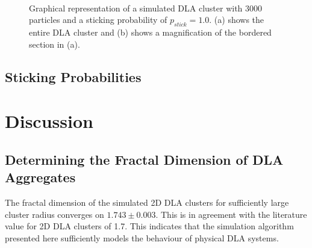 \documentclass[11pt]{iopart}
\begin{document}
\begin{figure}[t]
    \centering
    \quad
     \\
 
    \caption{Graphical representation of a simulated DLA cluster with 3000 particles and a sticking probability of $p_{stick} = 1.0$. (a) shows the entire DLA cluster and (b) shows a magnification of the bordered section in (a).}
    \label{fig:selfsimilar}
\end{figure}

\subsection{Sticking Probabilities}

\section{Discussion}
\subsection{Determining the Fractal Dimension of DLA Aggregates}

The fractal dimension of the simulated 2D DLA clusters for sufficiently large cluster radius converges on $1.743 \pm 0.003$. This is in agreement with the literature value for 2D DLA clusters of 1.7\cite{fractalindexref}. This indicates that the simulation algorithm presented here sufficiently models the behaviour of physical DLA systems.
\end{document}
